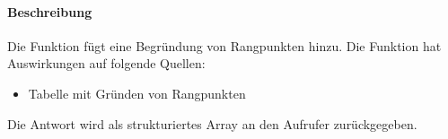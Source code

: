 \paragraph{Beschreibung} Die Funktion fügt eine Begründung von Rangpunkten hinzu. Die Funktion hat Auswirkungen auf folgende Quellen:
\begin{itemize}
	\item Tabelle mit Gründen von Rangpunkten
\end{itemize}
Die Antwort wird als strukturiertes Array an den Aufrufer zurückgegeben.
